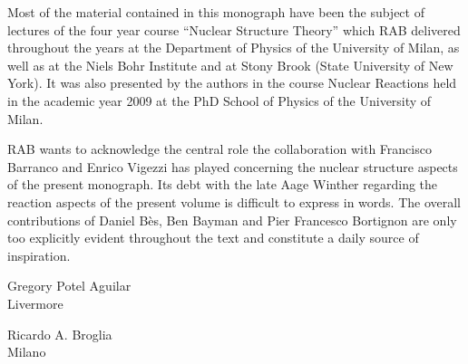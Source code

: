   Most of the material contained in this monograph have been the subject of lectures of the four year course ``Nuclear Structure Theory'' which RAB delivered throughout the years at the Department of Physics of the University of Milan, as well as at the Niels Bohr Institute and at Stony Brook (State University of New York). It was also presented by the authors in the course Nuclear Reactions held in the academic year 2009 at the PhD School of Physics of the University of Milan.


RAB wants to acknowledge the central role the collaboration with Francisco Barranco and Enrico Vigezzi has played concerning the nuclear structure aspects of the present monograph. Its debt with the late Aage Winther regarding the reaction aspects of the present volume is difficult to express in words. The overall contributions of Daniel B\`{e}s, Ben Bayman and Pier Francesco Bortignon are only too explicitly evident throughout the text and constitute a daily source of inspiration.  
\begin{flushleft}
Gregory Potel Aguilar\\
 Livermore
\end{flushleft}
\vspace{-1.7cm}
\begin{flushright}
Ricardo A. Broglia\\
 Milano
\end{flushright}



% 
 
